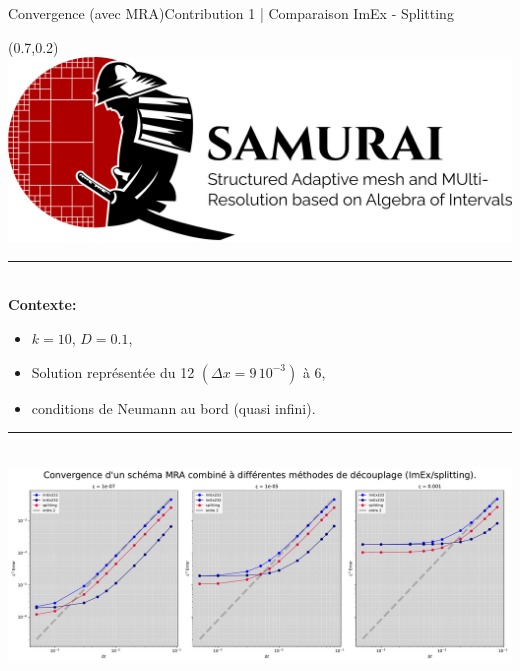 \begin{frame}{Convergence (avec MRA)}{Contribution 1 | Comparaison ImEx - Splitting}
    \begin{textblock*}{40pt}(0.7\paperwidth,0.2\paperheight)
        \includegraphics[scale=.03]{medias/2_/1_/light_logo.png}
    \end{textblock*}
    \noindent\color{Primary}\rule{\linewidth}{0.6pt}\color{black}\\
    \textbf{Contexte:\\}
    \begin{itemize}
        \item $k=10$, $D=0.1$,
        \item Solution représentée du 12 $(\Delta x = 9\, 10^{-3})$ à 6,
        \item conditions de Neumann au bord (quasi infini).
    \end{itemize}   
    \noindent\color{Primary}\rule{\linewidth}{0.6pt}\color{black}\\

    \centering\includegraphics[width = .8\textwidth]{ medias/2_/1_/couplage_MRA_temps_k10_D01.pdf }
\end{frame}